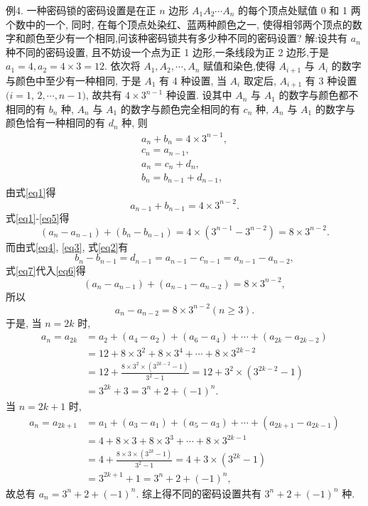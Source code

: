 例4. 一种密码锁的密码设置是在正 $n$ 边形 $A_1 A_2 \cdots A_n$ 的每个顶点处赋值 0 和 1 两个数中的一个, 同时, 在每个顶点处染红、蓝两种颜色之一, 使得相邻两个顶点的数字和颜色至少有一个相同,问该种密码锁共有多少种不同的密码设置?
解:设共有 $a_n$ 种不同的密码设置, 且不妨设一个点为正 1 边形,一条线段为正 2 边形,于是 $a_1=4, a_2=4 \times 3=12$.
依次将 $A_1, A_2, \cdots, A_n$ 赋值和染色,使得 $A_{i+1}$ 与 $A_i$ 的数字与颜色中至少有一种相同, 于是 $A_1$ 有 4 种设置, 当 $A_i$ 取定后, $A_{i+1}$ 有 3 种设置 $(i=1$, $2, \cdots, n-1)$, 故共有 $4 \times 3^{n-1}$ 种设置.
设其中 $A_n$ 与 $A_1$ 的数字与颜色都不相同的有 $b_n$ 种, $A_n$ 与 $A_1$ 的数字与颜色完全相同的有 $c_n$ 种, $A_n$ 与 $A_1$ 的数字与颜色恰有一种相同的有 $d_n$ 种, 则
$$
\begin{gathered}
a_n+b_n=4 \times 3^{n-1}, \label{eq1}\\
c_n=a_{n-1}, \label{eq2}\\
a_n=c_n+d_n, \label{eq4}\\
b_n=b_{n-1}+d_{n-1},\label{eq4}
\end{gathered}
$$
由式\ref{eq1}得
$$
a_{n-1}+b_{n-1}=4 \times 3^{n-2} . \label{eq5}
$$
式\ref{eq1}-\ref{eq5}得
$$
\left(a_n-a_{n-1}\right)+\left(b_n-b_{n-1}\right)=4 \times\left(3^{n-1}-3^{n-2}\right)=8 \times 3^{n-2} . \label{eq6}
$$
而由式\ref{eq4}, \ref{eq3}, 式\ref{eq2}有
$$
b_n-b_{n-1}=d_{n-1}=a_{n-1}-c_{n-1}=a_{n-1}-a_{n-2}, \label{eq7}
$$
式\ref{eq7}代入\ref{eq6}得
$$
\left(a_n-a_{n-1}\right)+\left(a_{n-1}-a_{n-2}\right)=8 \times 3^{n-2},
$$
所以
$$
a_n-a_{n-2}=8 \times 3^{n-2}(n \geqslant 3) .
$$
于是, 当 $n=2 k$ 时,
$$
\begin{aligned}
a_n=a_{2 k} & =a_2+\left(a_4-a_2\right)+\left(a_6-a_4\right)+\cdots+\left(a_{2 k}-a_{2 k-2}\right) \\
& =12+8 \times 3^2+8 \times 3^4+\cdots+8 \times 3^{2 k-2} \\
& =12+\frac{8 \times 3^2 \times\left(3^{2 k-2}-1\right)}{3^2-1}=12+3^2 \times\left(3^{2 k-2}-1\right) \\
& =3^{2 k}+3=3^n+2+(-1)^n .
\end{aligned}
$$
当 $n=2 k+1$ 时,
$$
\begin{aligned}
a_n=a_{2 k+1} & =a_1+\left(a_3-a_1\right)+\left(a_5-a_3\right)+\cdots+\left(a_{2 k+1}-a_{2 k-1}\right) \\
& =4+8 \times 3+8 \times 3^3+\cdots+8 \times 3^{2 k-1} \\
& =4+\frac{8 \times 3 \times\left(3^{2 k}-1\right)}{3^2-1}=4+3 \times\left(3^{2 k}-1\right) \\
& =3^{2 k+1}+1=3^n+2+(-1)^n,
\end{aligned}
$$
故总有 $a_n=3^n+2+(-1)^n$.
综上得不同的密码设置共有 $3^n+2+(-1)^n$ 种.



